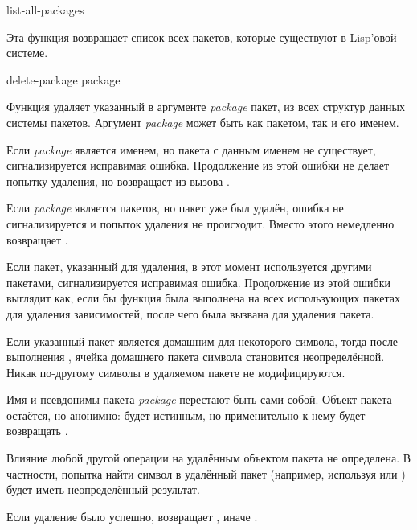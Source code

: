 \begin{defun}[Функция]
list-all-packages 

Эта функция возвращает список всех пакетов, которые существуют в Lisp'овой
системе. 
\end{defun}

\begin{defun}[Функция]
delete-package package

Функция  удаляет указанный в аргументе \emph{package} пакет,
из всех структур данных системы пакетов.
Аргумент \emph{package} может быть как пакетом, так и его именем.

Если \emph{package} является именем, но пакета с данным именем не существует,
сигнализируется исправимая ошибка. Продолжение из этой ошибки не делает попытку
удаления, но возвращает  из вызова .

Если \emph{package} является пакетов, но пакет уже был удалён,
ошибка не сигнализируется и попыток удаления не происходит. Вместо этого
 немедленно возвращает .

Если пакет, указанный для удаления, в этот момент используется другими пакетами,
сигнализируется исправимая ошибка. Продолжение из этой ошибки выглядит как, если
бы функция  была выполнена на всех использующих пакетах для
удаления зависимостей, после чего была вызвана  для удаления
пакета.

Если указанный пакет является домашним для некоторого символа, тогда после
выполнения , ячейка домашнего пакета символа становится
неопределённой. Никак по-другому символы в удаляемом пакете не модифицируются.

Имя и псевдонимы пакета \emph{package} перестают быть сами собой. Объект пакета
остаётся, но анонимно:  будет истинным, но 
применительно к нему будет возвращать .

Влияние любой другой операции на удалённым объектом пакета не определена. В
частности, попытка найти символ в удалённый пакет (например, используя 
или ) будет иметь неопределённый результат.

Если удаление было успешно,  возвращает , иначе .
\end{defun}

